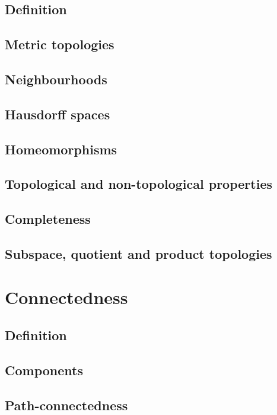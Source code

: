 \documentclass[main.tex]{subfiles}
\begin{document}
	\subsection{Definition}
	
	\subsection{Metric topologies}
	
	\subsection{Neighbourhoods}
	
	\subsection{Hausdorff spaces}
	
	\subsection{Homeomorphisms}
	
	\subsection{Topological and non-topological properties}
	
	\subsection{Completeness}
	
	\subsection{Subspace, quotient and product topologies}
	
	\section{Connectedness}
	\subsection{Definition}
	
	\subsection{Components}
	
	\subsection{Path-connectedness}
	
\end{document}
